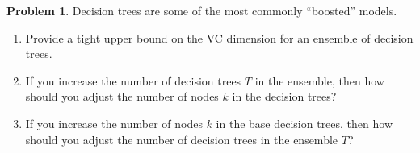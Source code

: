 \documentclass[10pt]{exam}
\theoremstyle{definition}
\newtheorem{problem}{Problem}
\begin{document}
\newpage
\begin{problem}
    Decision trees are some of the most commonly ``boosted'' models.
    \begin{enumerate}
        \item
        Provide a tight upper bound on the VC dimension for an ensemble of decision trees.
            \vspace{3in}
        \item
            If you increase the number of decision trees $T$ in the ensemble, 
            then how should you adjust the number of nodes $k$ in the decision trees?
            \vspace{2.5in}
        \item
            If you increase the number of nodes $k$ in the base decision trees,
            then how should you adjust the number of decision trees in the ensemble $T$?
    \end{enumerate}
\end{problem}
\end{document}
